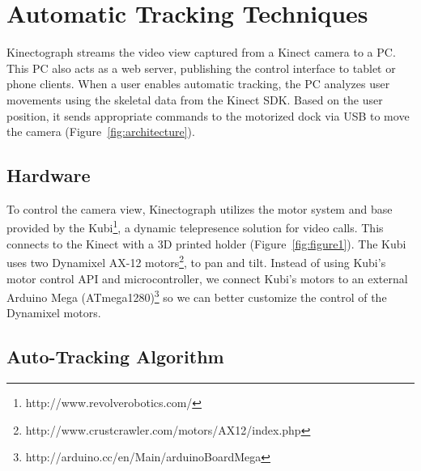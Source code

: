 \section{Automatic Tracking Techniques}
\label{kinectograph_tracking}

Kinectograph streams the video view captured from a Kinect camera to a PC. This PC also acts as a web server, publishing the control interface to tablet or phone clients. When a user enables automatic tracking, the PC analyzes user movements using the skeletal data from the Kinect SDK. Based on the user position, it sends appropriate commands to the motorized dock via USB to move the camera (Figure~\ref{fig:architecture}).

\subsection{Hardware}
To control the camera view, Kinectograph utilizes the motor system and base provided by the Kubi\footnote{http://www.revolverobotics.com/}, a dynamic telepresence solution for video calls. This connects to the Kinect with a 3D printed holder (Figure~\ref{fig:figure1}). The Kubi uses two Dynamixel AX-12 motors\footnote{http://www.crustcrawler.com/motors/AX12/index.php}, to pan and tilt. Instead of using Kubi's motor control API and microcontroller, we connect Kubi's motors to an external Arduino Mega (ATmega1280)\footnote{http://arduino.cc/en/Main/arduinoBoardMega} so we can better customize the control of the Dynamixel motors.


\subsection{Auto-Tracking Algorithm}

